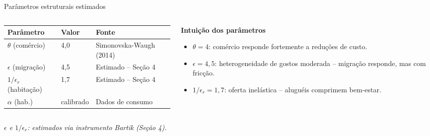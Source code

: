 \begin{frame}{Parâmetros estruturais estimados}
    \begin{columns}[T]
        \begin{column}{0.52\textwidth}
            \footnotesize\renewcommand{\arraystretch}{1.35}
            \begin{tabular}{llp{3cm}}
                \toprule
                Parâmetro & Valor & Fonte \\
                \midrule
                $\theta$ (comércio) & 4,0 & Simonovska-Waugh (2014) \\
                $\epsilon$ (migração) & 4,5 & Estimado -- Seção 4 \\
                $1/\epsilon_r$ (habitação) & 1,7 & Estimado -- Seção 4 \\
                $\alpha$ (hab.) & calibrado & Dados de consumo \\
                \bottomrule
            \end{tabular}
        \end{column}
        \begin{column}{0.44\textwidth}
            \vspace{-0.1cm}
            \normalsize\textbf{Intuição dos parâmetros}
            \begin{itemize}\small
                \item \textbf{$\theta = 4$}: comércio responde fortemente a reduções de custo.
                \item \textbf{$\epsilon = 4{,}5$}: heterogeneidade de gostos moderada -- migração responde, mas com fricção.
                \item \textbf{$1/\epsilon_r = 1{,}7$}: oferta inelástica -- aluguéis comprimem bem-estar.
            \end{itemize}
        \end{column}
    \end{columns}

    {\tiny\textit{$\epsilon$ e $1/\epsilon_r$: estimados via instrumento Bartik (Seção 4).}}
\end{frame}
